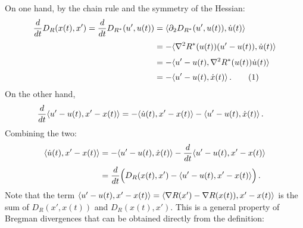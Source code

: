 \documentclass[12pt]{article}
\theoremstyle{plain}
\theoremstyle{definition}
\theoremstyle{remark}
\begin{document}
On one hand, by the chain rule and the symmetry of the Hessian:
\begin{align*}
%
\frac{d}{dt} D_{R}(x(t), x')
=\frac{d}{dt} D_{R^{*}}(u', u(t))
&= \ab{ \partial_{2} D_{R^{*}}(u', u(t)), \dot{u}(t)} \\[1mm]
&= - \ab{ \nabla^2 R^{*}(u(t))(u' -u(t)), \dot{u}(t) } \\[1mm]
&= - \ab{ u' -u(t), \nabla^2 R^{*}(u(t)) \dot{u}(t) } \\[1mm]
&= - \ab{u' - u(t), \dot{x}(t)}\,.
\addtocounter{equation}{1}
\label{eq.deriv.diver.dual}  \tag{\theequation}
\end{align*}
On the other hand,
\begin{align*}
\frac{d}{dt} \langle {u' - u(t), x' - x(t)}\rangle
&= - \langle { \dot{u}(t), x' - x(t)}\rangle - \langle { u' -u(t), \dot{x}(t) }\rangle\,.
\end{align*}
Combining the two:
\begin{align*}
%
\ab{ \dot{u}(t), x' - x(t)}
&= - \ab{ u' -u(t), \dot{x}(t) } - \frac{d}{dt} \ab{u' - u(t), x' - x(t)} \\[1mm]
&= \frac{d}{dt} \Bigl( D_{R}(x(t), x') - \ab{u' - u(t), x' - x(t)} \Bigr)\,.
\end{align*}
Note that the term
$\langle {u' - u(t), x' - x(t)}\rangle = \langle {\nabla R(x') - \nabla R(x(t)), x' - x(t)}\rangle$
is the sum of $D_{R}(x', x(t))$ and $D_{R}(x(t), x')$.
This is a general property of Bregman divergences that can be obtained directly from the definition:
\end{document}
